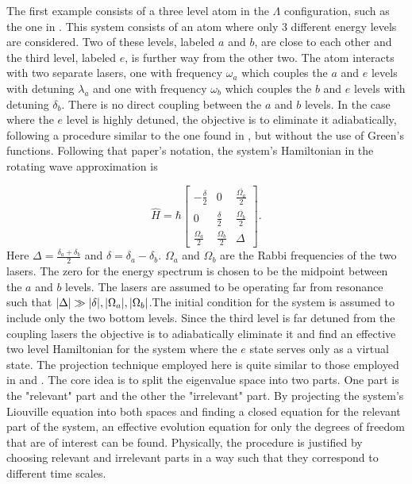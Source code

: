 \documentclass[12pt]{article}
\begin{document}
The first example consists of a three level atom in the $\Lambda$ configuration, such as the one in \cite{Ying3LevelAtom1996}. This system consists of an atom where only 3 different energy levels are considered. Two of these levels, labeled $a$ and $b$, are close to each other and the third level, labeled $e$, is further way from the other two. The atom interacts with two separate lasers, one with frequency $\omega_a$ which couples the $a$ and $e$ levels with detuning $\lambda_a$ and one with frequency $\omega_b$ which couples the $b$ and $e$ levels with detuning $\delta_b$. There is no direct coupling between the $a$ and $b$ levels. In the case where the $e$ level is highly detuned, the objective is to eliminate it adiabatically, following a procedure similar to the one found in \cite{BrionAdiabatic2006}, but without the use of Green's functions. Following that paper's notation,  the system's Hamiltonian in the rotating wave approximation is

\begin{equation}\label{eq:Lambda_Hamiltonian}
    \widehat{H}=\hbar\left[\begin{array}{ccc}
-\frac{\delta}{2} & 0 & \frac{\overline{\Omega_{a}}}{2} \\
0 & \frac{\delta}{2} & \frac{\overline{\Omega_{b}}}{2} \\
\frac{\Omega_{a}}{2} & \frac{\Omega_{b}}{2} & \Delta
\end{array}\right].
\end{equation} Here $\Delta = \frac{\delta_a+\delta_b}{2}$ and $\delta = \delta_a-\delta_b$. $\Omega_a$ and $\Omega_b$ are the Rabbi frequencies of the two lasers. The zero for the energy spectrum is chosen to be the midpoint between the $a$ and $b$ levels. The lasers are assumed to be operating far from resonance such that $\abs{\Delta} \gg \abs{\delta},\abs{\Omega_a}, \abs{\Omega_b}$.The initial condition for the system is assumed to include only the two bottom levels. Since the third level is far detuned from the coupling lasers the objective is to adiabatically eliminate it and find an effective two level Hamiltonian for the system where the $e$ state serves only as a virtual state\cite{Gerry3LA1990}. The projection technique employed here is quite similar to those employed in \cite{NakajimaProyectors1958} and \cite{ZwanzigProyectors1960}. The core idea is to split the eigenvalue space into two parts. One part is the "relevant" part and the other the "irrelevant" part. By projecting the system's Liouville equation into both spaces and finding a closed equation for the relevant part of the system, an effective evolution equation for only the degrees of freedom that are of interest can be found. Physically, the procedure is justified by choosing relevant and irrelevant parts in a way such that they correspond to different time scales.
\end{document}
